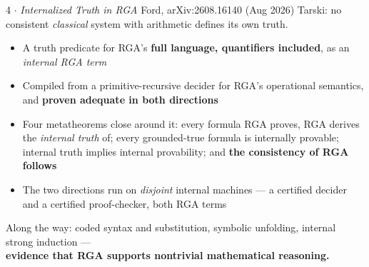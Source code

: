 \documentclass[aspectratio=169,11pt]{beamer}
\newcommand{\key}[1]{{\color{accent}\textbf{#1}}}
\begin{document}
\begin{frame}{4 $\cdot$ \emph{Internalized Truth in RGA}}
  {\small Ford, arXiv:2608.16140 (Aug 2026)}
  \vfill
  Tarski: no consistent \emph{classical} system with arithmetic defines its own truth.
  \vfill
  \begin{itemize}\itemsep0.6em
    \item A truth predicate for RGA's \key{full language, quantifiers included},
          as an \emph{internal RGA term}
    \item Compiled from a primitive-recursive decider for RGA's operational
          semantics, and \key{proven adequate in both directions}
    \item Four metatheorems close around it: every formula RGA proves, RGA derives
          the \emph{internal truth} of; every grounded-true formula is internally
          provable; internal truth implies internal provability; and \key{the
          consistency of RGA follows}
    \item The two directions run on \emph{disjoint} internal machines --- a certified
          decider and a certified proof-checker, both RGA terms
  \end{itemize}
  \vfill
  \begin{center}\small
    Along the way: coded syntax and substitution, symbolic unfolding, internal
    strong induction ---\\
    \key{evidence that RGA supports nontrivial mathematical reasoning.}
  \end{center}
\end{frame}
\end{document}
